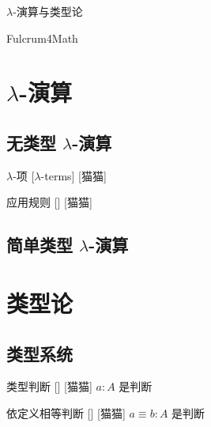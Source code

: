 \documentclass[UTF8]{ctexart}
\begin{document}
\begin{center}
    {\LARGE \(\lambda\)-演算与类型论}

    Fulcrum4Math
\end{center}

\tableofcontents
\newpage

\section{\(\lambda\)-演算}

    \subsection{无类型 \(\lambda\)-演算}
    
        \begin{dfn}
            {\(\lambda\)-项}
            [\(\lambda\)-terms]
            [猫猫]

        \end{dfn}
        
        \begin{axm}
            {应用规则}
            []
            [猫猫]

        \end{axm}

    \subsection{简单类型 \(\lambda\)-演算}

\section{类型论}

    \subsection{类型系统}
    
        \begin{dfn}
            []
            {类型判断}
            []
            [猫猫]
            \(a:A\) 是判断
        \end{dfn}
        
        \begin{dfn}
            []
            {依定义相等判断}
            []
            [猫猫]
            \(a \equiv b:A\) 是判断
        \end{dfn}
        
\end{document}

